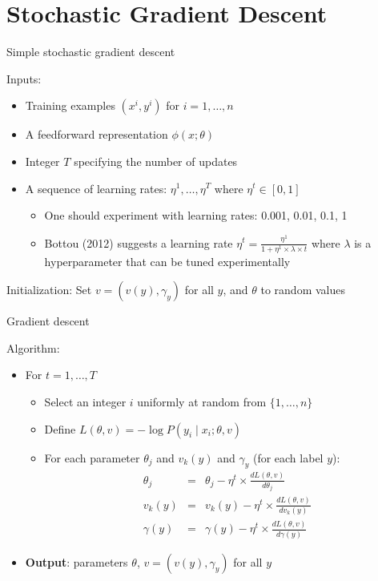 \section{Stochastic Gradient Descent}
\frame{\tableofcontents[currentsection]}

\begin{frame}{Simple stochastic gradient descent}
\begin{block}{Inputs:}
\begin{itemize}[<+->]
\item Training examples $(x^i, y^i)$ for $i = 1, \ldots, n$
\item A feedforward representation $\phi(x; \theta)$
\item Integer $T$ specifying the number of updates
\item A sequence of learning rates: $\eta^1, \ldots, \eta^T$ where $\eta^t \in [0,1]$
\begin{itemize}[<+->]
\item One should experiment with learning rates: 0.001, 0.01, 0.1, 1
\item Bottou (2012) suggests a learning rate $\eta^t = \frac{\eta^1}{1 + \eta^1 \times \lambda \times t}$ where $\lambda$ is a hyperparameter that can be tuned experimentally
\end{itemize}
\end{itemize}
\end{block}
\pause
\begin{block}{Initialization:}
Set $v = (v(y), \gamma_y)$ for all $y$, and $\theta$ to random values
\end{block}
\end{frame}


\begin{frame}{Gradient descent}
\begin{block}{Algorithm:}
\begin{itemize}[<+->]
\item For $t = 1, \ldots, T$
\begin{itemize}[<+->]
\item Select an integer $i$ uniformly at random from $\{ 1, \ldots, n \}$
\item Define $L(\theta, v) = - \log P(y_i \mid x_i; \theta, v)$
\item For each parameter $\theta_j$ and $v_k(y)$ and $\gamma_y$ (for each label $y$):
\begin{eqnarray*}
\theta_j &=& \theta_j - \eta^t \times \frac{dL(\theta,v)}{d\theta_j} \\
v_k(y) &=& v_k(y) - \eta^t \times \frac{dL(\theta,v)}{d v_k(y)} \\
\gamma(y) &=& \gamma(y) - \eta^t \times \frac{dL(\theta,v)}{d \gamma(y)}
\end{eqnarray*}
\end{itemize}
\item \textbf{Output}: parameters $\theta$, $v = (v(y), \gamma_y)$ for all $y$
\end{itemize}
\end{block}
\end{frame}


